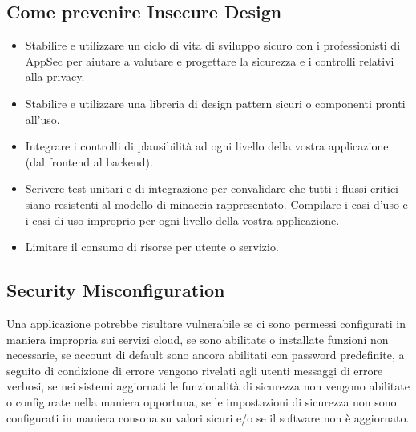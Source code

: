 \subsection{Come prevenire Insecure Design} 
\begin{itemize}
    \item Stabilire e utilizzare un ciclo di vita di sviluppo sicuro con i professionisti di AppSec per aiutare a valutare e progettare la sicurezza e i controlli relativi alla privacy.
    \item Stabilire e utilizzare una libreria di design pattern sicuri o componenti pronti all'uso.
    \item Integrare i controlli di plausibilità ad ogni livello della vostra applicazione (dal frontend al backend).
    \item Scrivere test unitari e di integrazione per convalidare che tutti i flussi critici siano resistenti al modello di minaccia rappresentato. Compilare i casi d'uso e i casi di uso improprio per ogni livello della vostra applicazione.
    \item Limitare il consumo di risorse per utente o servizio.  
\end{itemize}
\subsection{Security Misconfiguration}
Una applicazione potrebbe risultare vulnerabile se ci sono permessi configurati in maniera impropria sui servizi cloud, se sono abilitate o installate funzioni non necessarie, se account di default sono ancora abilitati con password predefinite, a seguito di condizione di errore vengono rivelati agli utenti messaggi di errore verbosi, se nei sistemi aggiornati le funzionalità di sicurezza non vengono abilitate o configurate nella maniera opportuna, se le impostazioni di sicurezza non sono configurati in maniera consona su valori sicuri e/o se  il software non è aggiornato.
